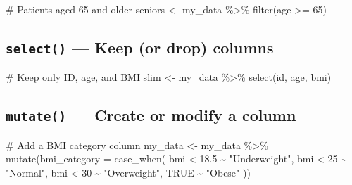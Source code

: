 \documentclass[
  letterpaper,
  DIV=11,
  numbers=noendperiod,
  oneside]{scrreprt}
\newenvironment{Shaded}{\begin{snugshade}}{\end{snugshade}}
\newcommand{\AttributeTok}[1]{\textcolor[rgb]{0.40,0.45,0.13}{#1}}
\newcommand{\CommentTok}[1]{\textcolor[rgb]{0.37,0.37,0.37}{#1}}
\newcommand{\ConstantTok}[1]{\textcolor[rgb]{0.56,0.35,0.01}{#1}}
\newcommand{\DecValTok}[1]{\textcolor[rgb]{0.68,0.00,0.00}{#1}}
\newcommand{\FloatTok}[1]{\textcolor[rgb]{0.68,0.00,0.00}{#1}}
\newcommand{\FunctionTok}[1]{\textcolor[rgb]{0.28,0.35,0.67}{#1}}
\newcommand{\NormalTok}[1]{\textcolor[rgb]{0.00,0.23,0.31}{#1}}
\newcommand{\OtherTok}[1]{\textcolor[rgb]{0.00,0.23,0.31}{#1}}
\newcommand{\SpecialCharTok}[1]{\textcolor[rgb]{0.37,0.37,0.37}{#1}}
\newcommand{\StringTok}[1]{\textcolor[rgb]{0.13,0.47,0.30}{#1}}
\begin{document}
\begin{Shaded}
\begin{Highlighting}[numbers=left,,]
\CommentTok{\# Patients aged 65 and older}
\NormalTok{seniors }\OtherTok{\textless{}{-}}\NormalTok{ my\_data }\SpecialCharTok{\%\textgreater{}\%} \FunctionTok{filter}\NormalTok{(age }\SpecialCharTok{\textgreater{}=} \DecValTok{65}\NormalTok{)}
\end{Highlighting}
\end{Shaded}

\subsection*{\texorpdfstring{\texttt{select()} --- Keep (or drop)
columns}{select() --- Keep (or drop) columns}}\label{select-keep-or-drop-columns}

\begin{Shaded}
\begin{Highlighting}[numbers=left,,]
\CommentTok{\# Keep only ID, age, and BMI}
\NormalTok{slim }\OtherTok{\textless{}{-}}\NormalTok{ my\_data }\SpecialCharTok{\%\textgreater{}\%} \FunctionTok{select}\NormalTok{(id, age, bmi)}
\end{Highlighting}
\end{Shaded}

\subsection*{\texorpdfstring{\texttt{mutate()} --- Create or modify a
column}{mutate() --- Create or modify a column}}\label{mutate-create-or-modify-a-column}

\begin{Shaded}
\begin{Highlighting}[numbers=left,,]
\CommentTok{\# Add a BMI category column}
\NormalTok{my\_data }\OtherTok{\textless{}{-}}\NormalTok{ my\_data }\SpecialCharTok{\%\textgreater{}\%}
  \FunctionTok{mutate}\NormalTok{(}\AttributeTok{bmi\_category =} \FunctionTok{case\_when}\NormalTok{(}
\NormalTok{    bmi }\SpecialCharTok{\textless{}} \FloatTok{18.5} \SpecialCharTok{\textasciitilde{}} \StringTok{"Underweight"}\NormalTok{,}
\NormalTok{    bmi }\SpecialCharTok{\textless{}} \DecValTok{25}   \SpecialCharTok{\textasciitilde{}} \StringTok{"Normal"}\NormalTok{,}
\NormalTok{    bmi }\SpecialCharTok{\textless{}} \DecValTok{30}   \SpecialCharTok{\textasciitilde{}} \StringTok{"Overweight"}\NormalTok{,}
    \ConstantTok{TRUE}       \SpecialCharTok{\textasciitilde{}} \StringTok{"Obese"}
\NormalTok{  ))}
\end{Highlighting}
\end{Shaded}
\end{document}
